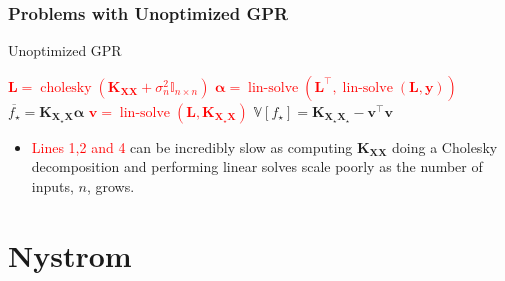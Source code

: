 \documentclass[9pt,hyperref={pdfpagelabels=false},xcolor=table]{beamer}
\begin{document}
\begin{frame}
    \frametitle{Problems with Unoptimized GPR}
    {\centering
        \begin{minipage}{.9\linewidth}
            \begin{algorithm}[H]
                \caption{Unoptimized GPR}
                \SetAlgoLined
                \DontPrintSemicolon

                \BlankLine
                \textcolor{red}{$\bm{L} = \operatorname{cholesky} \left( \bm{K_{XX}} + \sigma_n^2 \mathbb{I}_{n \times n} \right)$}\;
                \textcolor{red}{$\bm{\alpha} = \operatorname{lin-solve} \left( \bm{L}^{\intercal} , \operatorname{lin-solve} \left( \bm{L}, \bm{y} \right) \right)$}\;
                $\overline{f_{\star}} = \bm{K_{X_{\star} X}} \bm{\alpha}$\;
                \textcolor{red}{$\bm{v} = \operatorname{lin-solve} \left( \bm{L}, \bm{K_{X_{\star} X}} \right)$}\;
                $\mathbb{V} \left[ f_{\star} \right] = \bm{K_{X_{\star} X_{\star}}} - \bm{v}^{\intercal} \bm{v}$\;
                \BlankLine
            \end{algorithm}
        \end{minipage}
        \par
    }
    \begin{itemize}
        \item \textcolor{red}{Lines 1,2 and 4} can be incredibly slow as computing $\bm{K_{XX}}$ doing a Cholesky decomposition and performing linear solves scale poorly as the number of inputs, $n$, grows.
    \end{itemize}
\end{frame}

\section{Nystrom}
\end{document}
